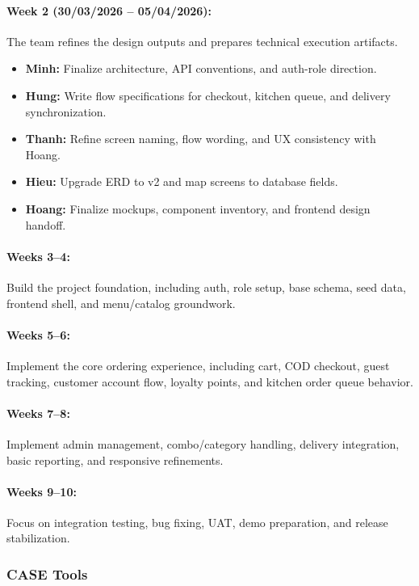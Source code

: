 \paragraph{Week 2 (30/03/2026 -- 05/04/2026):} The team refines the design outputs and prepares technical execution artifacts.
\begin{itemize}
    \item \textbf{Minh:} Finalize architecture, API conventions, and auth-role direction.
    \item \textbf{Hung:} Write flow specifications for checkout, kitchen queue, and delivery synchronization.
    \item \textbf{Thanh:} Refine screen naming, flow wording, and UX consistency with Hoang.
    \item \textbf{Hieu:} Upgrade ERD to v2 and map screens to database fields.
    \item \textbf{Hoang:} Finalize mockups, component inventory, and frontend design handoff.
\end{itemize}

\paragraph{Weeks 3--4:} Build the project foundation, including auth, role setup, base schema, seed data, frontend shell, and menu/catalog groundwork.

\paragraph{Weeks 5--6:} Implement the core ordering experience, including cart, COD checkout, guest tracking, customer account flow, loyalty points, and kitchen order queue behavior.

\paragraph{Weeks 7--8:} Implement admin management, combo/category handling, delivery integration, basic reporting, and responsive refinements.

\paragraph{Weeks 9--10:} Focus on integration testing, bug fixing, UAT, demo preparation, and release stabilization.

\subsubsection{CASE Tools}

